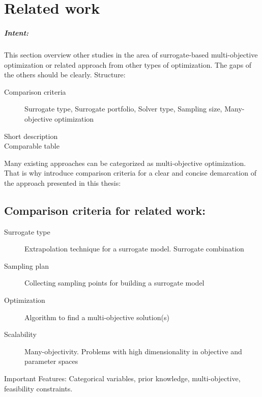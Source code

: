 \chapter{Related work}\label{sec:related}

    \begin{blockquote}
        \paragraph{Intent:} This section overview other studies in the area of surrogate-based multi-objective optimization or related approach from other types of optimization. The gaps of the others should be clearly. 
        Structure:
        \begin{description}
            \item[Comparison criteria] Surrogate type, Surrogate portfolio, Solver type, Sampling size, Many-objective optimization
            \item[Short description] 
            \item[Comparable table] 
        \end{description}
    \end{blockquote}



    Many existing approaches can be categorized as multi-objective optimization. That is why introduce comparison criteria for a clear and concise demarcation of the approach presented in this thesis:
    \section{Comparison criteria for related work:}
    \begin{description}
        \item[Surrogate type] Extrapolation technique for a surrogate model. Surrogate combination
        \item[Sampling plan] Collecting sampling points for building a surrogate model
        \item[Optimization] Algorithm to find a multi-objective solution(s)
        \item[Scalability] Many-objectivity. Problems with high dimensionality in objective and parameter spaces                
    \end{description}
    Important Features: Categorical variables, prior knowledge, multi-objective, feasibility constraints.

